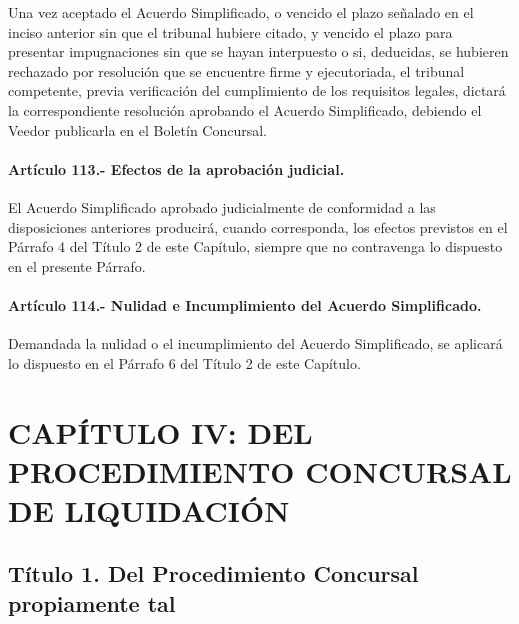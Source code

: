 \documentclass[
]{book}
\begin{document}
Una vez aceptado el Acuerdo Simplificado, o vencido el plazo señalado en el inciso anterior sin que el tribunal hubiere citado, y vencido el plazo para presentar impugnaciones sin que se hayan interpuesto o si, deducidas, se hubieren rechazado por resolución que se encuentre firme y ejecutoriada, el tribunal competente, previa verificación del cumplimiento de los requisitos legales, dictará la correspondiente resolución aprobando el Acuerdo Simplificado, debiendo el Veedor publicarla en el Boletín Concursal.

\hypertarget{artuxedculo-113.--efectos-de-la-aprobaciuxf3n-judicial.}{%
\paragraph*{Artículo 113.- Efectos de la aprobación judicial.}\label{artuxedculo-113.--efectos-de-la-aprobaciuxf3n-judicial.}}

El Acuerdo Simplificado aprobado judicialmente de conformidad a las disposiciones anteriores producirá, cuando corresponda, los efectos previstos en el Párrafo 4 del Título 2 de este Capítulo, siempre que no contravenga lo dispuesto en el presente Párrafo.

\hypertarget{artuxedculo-114.--nulidad-e-incumplimiento-del-acuerdo-simplificado.}{%
\paragraph*{Artículo 114.- Nulidad e Incumplimiento del Acuerdo Simplificado.}\label{artuxedculo-114.--nulidad-e-incumplimiento-del-acuerdo-simplificado.}}

Demandada la nulidad o el incumplimiento del Acuerdo Simplificado, se aplicará lo dispuesto en el Párrafo 6 del Título 2 de este Capítulo.

\hypertarget{capuxedtulo-iv-del-procedimiento-concursal-de-liquidaciuxf3n}{%
\section*{CAPÍTULO IV: DEL PROCEDIMIENTO CONCURSAL DE LIQUIDACIÓN}\label{capuxedtulo-iv-del-procedimiento-concursal-de-liquidaciuxf3n}}

\hypertarget{tuxedtulo-1.-del-procedimiento-concursal-propiamente-tal}{%
\subsection*{Título 1. Del Procedimiento Concursal propiamente tal}\label{tuxedtulo-1.-del-procedimiento-concursal-propiamente-tal}}
\end{document}
